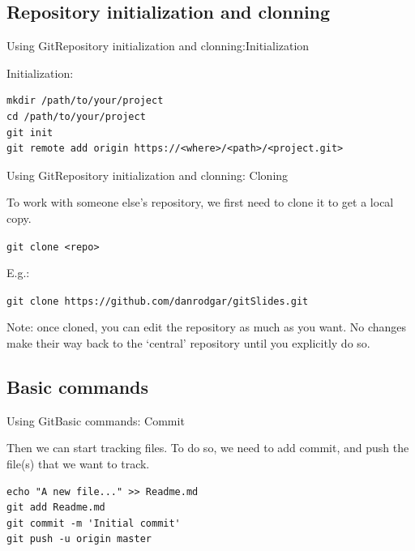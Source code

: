 \documentclass{beamer}
\begin{document}
\subsection{Repository initialization and clonning}
\begin{frame}[fragile]{Using Git}{Repository initialization and clonning:Initialization}

Initialization:

\begin{verbatim}
mkdir /path/to/your/project
cd /path/to/your/project
git init
git remote add origin https://<where>/<path>/<project.git>
\end{verbatim} 

\end{frame}

\begin{frame}{Using Git}{Repository initialization and clonning: Cloning}

To work with someone else’s repository, we first need to clone it to get a
local copy.

\texttt{git clone <repo>}

E.g.:

\texttt{git clone https://github.com/danrodgar/gitSlides.git}

Note: once cloned, you can edit the repository as much as you want. No changes make their way back to the ‘central’ repository until you explicitly do so.

\end{frame}


\subsection{Basic commands}
\begin{frame}[fragile]{Using Git}{Basic commands: Commit}

Then we can start tracking files. To do so, we need to add commit, and push the file(s) that we want to track.
%
\begin{verbatim}
echo "A new file..." >> Readme.md
git add Readme.md
git commit -m 'Initial commit'
git push -u origin master
\end{verbatim}

\end{frame}
\end{document}
